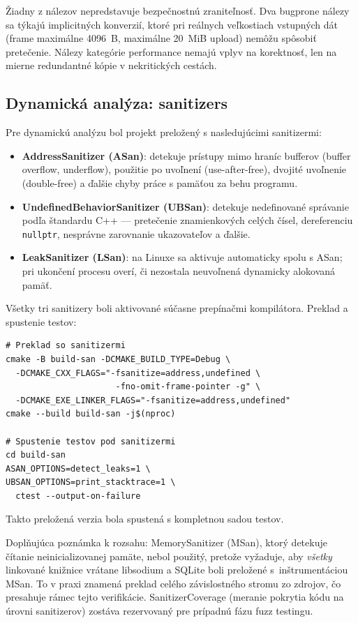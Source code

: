 \documentclass[journal,a4paper,onecolumn]{IEEEtran}
\begin{document}
Žiadny z nálezov nepredstavuje bezpečnostnú zraniteľnosť. Dva bugprone nálezy sa týkajú implicitných konverzií, ktoré pri reálnych veľkostiach vstupných dát (frame maximálne 4096~B, maximálne 20~MiB upload) nemôžu spôsobiť pretečenie. Nálezy kategórie performance nemajú vplyv na korektnosť, len na mierne redundantné kópie v nekritických cestách.

\subsection{Dynamická analýza: sanitizers}

Pre dynamickú analýzu bol projekt preložený s nasledujúcimi sanitizermi:

\begin{itemize}
\item \textbf{AddressSanitizer (ASan)}: detekuje prístupy mimo hraníc bufferov (buffer overflow, underflow), použitie po uvoľnení (use-after-free), dvojité uvoľnenie (double-free) a ďalšie chyby práce s pamäťou za behu programu.
\item \textbf{UndefinedBehaviorSanitizer (UBSan)}: detekuje nedefinované správanie podľa štandardu C++ --- pretečenie znamienkových celých čísel, dereferenciu \texttt{nullptr}, nesprávne zarovnanie ukazovateľov a ďalšie.
\item \textbf{LeakSanitizer (LSan)}: na Linuxe sa aktivuje automaticky spolu s ASan; pri ukončení procesu overí, či nezostala neuvoľnená dynamicky alokovaná pamäť.
\end{itemize}

Všetky tri sanitizery boli aktivované súčasne prepínačmi kompilátora. Preklad a spustenie testov:

\begin{verbatim}
# Preklad so sanitizermi
cmake -B build-san -DCMAKE_BUILD_TYPE=Debug \
  -DCMAKE_CXX_FLAGS="-fsanitize=address,undefined \
                      -fno-omit-frame-pointer -g" \
  -DCMAKE_EXE_LINKER_FLAGS="-fsanitize=address,undefined"
cmake --build build-san -j$(nproc)

# Spustenie testov pod sanitizermi
cd build-san
ASAN_OPTIONS=detect_leaks=1 \
UBSAN_OPTIONS=print_stacktrace=1 \
  ctest --output-on-failure
\end{verbatim}

\noindent Takto preložená verzia bola spustená s kompletnou sadou testov.

Doplňujúca poznámka k rozsahu: MemorySanitizer (MSan), ktorý detekuje čítanie neinicializovanej pamäte, nebol použitý, pretože vyžaduje, aby \emph{všetky} linkované knižnice vrátane libsodium a SQLite boli preložené s~inštrumentáciou MSan. To v praxi znamená preklad celého závislostného stromu zo zdrojov, čo presahuje rámec tejto verifikácie. SanitizerCoverage (meranie pokrytia kódu na úrovni sanitizerov) zostáva rezervovaný pre prípadnú fázu fuzz testingu.
\end{document}
